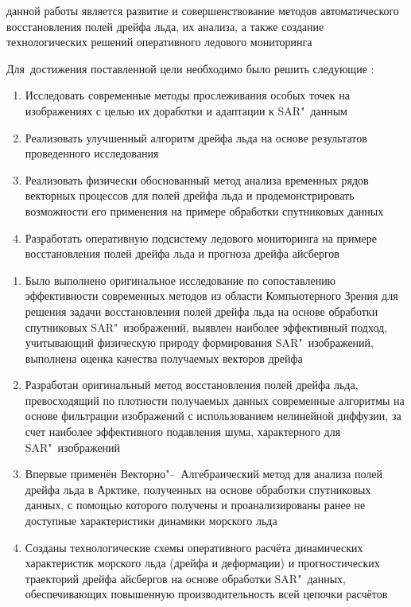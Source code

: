 {\aim} данной работы является развитие и совершенствование методов автоматического восстановления полей дрейфа льда, их анализа, а также создание технологических решений оперативного ледового мониторинга

Для~достижения поставленной цели необходимо было решить следующие {\tasks}:
\begin{enumerate}
  \item Исследовать современные методы прослеживания особых точек на изображениях с целью их доработки и адаптации к SAR"~данным
  \item Реализовать улучшенный алгоритм дрейфа льда на основе результатов проведенного исследования
  \item Реализовать физически обоснованный метод анализа временных рядов векторных процессов для полей дрейфа льда и продемонстрировать возможности его применения на примере обработки спутниковых данных
  \item Разработать оперативную подсистему ледового мониторинга на примере восстановления полей дрейфа льда и прогноза дрейфа айсбергов
\end{enumerate}


{\novelty}
\begin{enumerate}
  \item Было выполнено оригинальное исследование по сопоставлению эффективности современных методов из области Компьютерного Зрения для решения задачи восстановления полей дрейфа льда на основе обработки спутниковых SAR"~изображений, выявлен наиболее эффективный подход, учитывающий физическую природу формирования SAR"~изображений, выполнена оценка качества получаемых векторов дрейфа
  \item Разработан оригинальный метод восстановления полей дрейфа льда, превосходящий по плотности получаемых данных современные алгоритмы на основе фильтрации изображений с использованием нелинейной диффузии, за счет наиболее эффективного подавления шума, характерного для SAR"~изображений
  \item Впервые применён Векторно"--~Алгебраический метод для анализа полей дрейфа льда в Арктике, полученных на основе обработки спутниковых данных, с помощью которого получены и проанализированы ранее не доступные характеристики динамики морского льда
  \item Созданы технологические схемы оперативного расчёта динамических характеристик морского льда (дрейфа и деформации) и прогностических траекторий дрейфа айсбергов на основе обработки SAR"~данных, обеспечивающих повышенную производительность всей цепочки расчётов
\end{enumerate}

